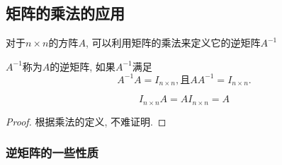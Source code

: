 
\subsection{矩阵的乘法的应用}


对于$n \times n$的方阵$A$, 可以利用矩阵的乘法来定义它的逆矩阵$A^{-1}$
\begin{definition}
    $A^{-1}$称为$A$的逆矩阵, 如果$A^{-1}$满足
    \begin{equation}
      A^{-1} A = I_{n \times n}, \text{且} A A^{-1} = I_{n \times n}.
    \end{equation}
\end{definition}

\begin{proposition}
    \begin{equation}
      I_{n \times n} A = A I_{n \times n} = A
    \end{equation}
\end{proposition}
\begin{proof}
    根据乘法的定义, 不难证明. 
\end{proof}

\subsubsection{逆矩阵的一些性质}

